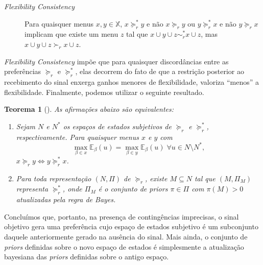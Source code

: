 \documentclass[12pt, a4paper]{article}
\theoremstyle{nonumberplain}
\theoremstyle{plain}
\newtheorem{theorem}{Teorema}
\theoremstyle{plain}
\theoremstyle{plain}
\theoremstyle{nonumberplain}
\begin{document}
\begin{description}
\item[\emph{Flexibility Consistency} \citep{Moura2013}] Para quaisquer menus $x,y\in \mathbb{X}$, $x\succcurlyeq^*_r y$ e não $x\succcurlyeq_r y$ ou $y\succcurlyeq^*_r x$ e não $y\succcurlyeq_r x$ implicam que existe um menu $z$ tal que $x\cup y\cup z \sim^*_r x\cup z$, mas $x\cup y\cup z \succ_r x\cup z$.
\end{description}

\emph{Flexibility Consistency} impõe que para quaisquer discordâncias entre as preferências $\succcurlyeq_r$ e $\succcurlyeq^*_r$, elas decorrem do fato de que a restrição posterior ao recebimento do sinal enxerga ganhos menores de flexibilidade, valoriza ``menos'' a flexibilidade. Finalmente, podemos utilizar o seguinte resultado.

\begin{theorem}[\cite{Moura2013}]
As afirmações abaixo são equivalentes:
\begin{enumerate}[1.]
\item Sejam $N$ e $N^*$ os espaços de estados subjetivos de $\succcurlyeq_r$ e $\succcurlyeq^*_r$, respectivamente. Para quaisquer menus $x$ e $y$ com 
$$\max_{\beta\in x}\mathbb{E}_\beta(u) = \max_{\beta\in y}\mathbb{E}_\beta(u)\;\forall u\in N\setminus N^*,$$
$x\succcurlyeq_r y \Leftrightarrow y\succcurlyeq^*_r x$.
\item Para toda representação $(N,\Pi)$ de $\succcurlyeq_r$, existe $M\subseteq N$ tal que $(M,\Pi_M)$ representa $\succcurlyeq_r^*$, onde $\Pi_M$ é o conjunto de \emph{priors} $\pi\in \Pi$ com $\pi(M)>0$ atualizadas pela regra de Bayes.
\end{enumerate}
\end{theorem}       

Concluímos que, portanto, na presença de contingências imprecisas, o sinal objetivo gera uma preferência cujo espaço de estados subjetivo é um subconjunto daquele anteriormente gerado na ausência do sinal. Mais ainda, o conjunto de \emph{priors} definidas sobre o novo espaço de estados é simplesmente a atualização bayesiana das \emph{priors} definidas sobre o antigo espaço.  
\clearpage
\end{document}
